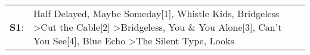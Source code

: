 \begin{supertabular}{p{0.03\textwidth}p{0.92\textwidth}}
 \textbf{S1}:  &  Half Delayed\textsuperscript{}, \enspace Maybe Someday[1]\textsuperscript{}, \enspace Whistle Kids\textsuperscript{}, \enspace Bridgeless\textsuperscript{} \textgreater \enspace Cut the Cable[2]\textsuperscript{} \textgreater \enspace Bridgeless\textsuperscript{}, \enspace You \& You Alone[3]\textsuperscript{}, \enspace Can't You See[4]\textsuperscript{}, \enspace Blue Echo\textsuperscript{} \textgreater \enspace The Silent Type\textsuperscript{}, \enspace Looks\textsuperscript{}  \enspace  \\
\end{supertabular}
